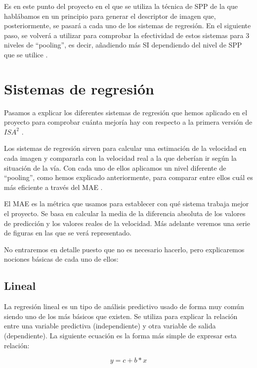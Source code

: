 Es en este punto del proyecto en el que se utiliza la técnica de \ac{SPP} \cite{spp} de la que hablábamos en un principio para generar el descriptor de imagen que, posteriormente, se pasará a cada uno de los sistemas de regresión. En el siguiente paso, se volverá a utilizar para comprobar la efectividad de estos sistemas para 3 niveles de ``pooling'', es decir, añadiendo más \ac{SI} dependiendo del nivel de \ac{SPP} que se utilice \cite{isa2}.

\section{Sistemas de regresión}

Pasamos a explicar los diferentes sistemas de regresión que hemos aplicado en el proyecto para comprobar cuánta mejoría hay con respecto a la primera versión de $ISA^{2}$ \cite{isa2}.

Los sistemas de regresión sirven para calcular una estimación de la velocidad en cada imagen y compararla con la velocidad real a la que deberían ir según la situación de la vía. Con cada uno de ellos aplicamos un nivel diferente de ``pooling'', como hemos explicado anteriormente, para comparar entre ellos cuál es más eficiente a través del \ac{MAE} \cite{mae}.
 
El \ac{MAE} es la métrica que usamos para establecer con qué sistema trabaja mejor el proyecto. Se basa en calcular la media de la diferencia absoluta de los valores de predicción y los valores reales de la velocidad. Más adelante veremos una serie de figuras en las que se verá representado.

No entraremos en detalle puesto que no es necesario hacerlo, pero explicaremos nociones básicas de cada uno de ellos:

\subsection{Lineal}

La regresión lineal \cite{linear} es un tipo de análisis predictivo usado de forma muy común siendo uno de los más básicos que existen. Se utiliza para explicar la relación entre una variable predictiva (independiente) y otra variable de salida (dependiente). La siguiente ecuación es la forma más simple de expresar esta relación:

\begin{equation}
y = c + b*x
\end{equation}

